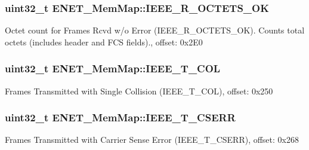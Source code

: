 \subsubsection[{I\+E\+E\+E\+\_\+\+R\+\_\+\+O\+C\+T\+E\+T\+S\+\_\+\+O\+K}]{\setlength{\rightskip}{0pt plus 5cm}uint32\+\_\+t E\+N\+E\+T\+\_\+\+Mem\+Map\+::\+I\+E\+E\+E\+\_\+\+R\+\_\+\+O\+C\+T\+E\+T\+S\+\_\+\+O\+K}\label{struct_e_n_e_t___mem_map_ad80de3963e00bd1d815615de321b1ee4}
Octet count for Frames Rcvd w/o Error (I\+E\+E\+E\+\_\+\+R\+\_\+\+O\+C\+T\+E\+T\+S\+\_\+\+O\+K). Counts total octets (includes header and F\+C\+S fields)., offset\+: 0x2\+E0 \hypertarget{struct_e_n_e_t___mem_map_a03ac6e803f105df7d966e0e147715072}{}
\subsubsection[{I\+E\+E\+E\+\_\+\+T\+\_\+1\+C\+O\+L}]{\setlength{\rightskip}{0pt plus 5cm}uint32\+\_\+t E\+N\+E\+T\+\_\+\+Mem\+Map\+::\+I\+E\+E\+E\+\_\+\+T\+\_\+C\+O\+L}\label{struct_e_n_e_t___mem_map_a03ac6e803f105df7d966e0e147715072}
Frames Transmitted with Single Collision (I\+E\+E\+E\+\_\+\+T\+\_\+C\+O\+L), offset\+: 0x250 \hypertarget{struct_e_n_e_t___mem_map_ab48cdc7505cabb90165d8e20ff2643e2}{}
\subsubsection[{I\+E\+E\+E\+\_\+\+T\+\_\+\+C\+S\+E\+R\+R}]{\setlength{\rightskip}{0pt plus 5cm}uint32\+\_\+t E\+N\+E\+T\+\_\+\+Mem\+Map\+::\+I\+E\+E\+E\+\_\+\+T\+\_\+\+C\+S\+E\+R\+R}\label{struct_e_n_e_t___mem_map_ab48cdc7505cabb90165d8e20ff2643e2}
Frames Transmitted with Carrier Sense Error (I\+E\+E\+E\+\_\+\+T\+\_\+\+C\+S\+E\+R\+R), offset\+: 0x268 \hypertarget{struct_e_n_e_t___mem_map_aafb1b9be07fdb0ed86bec13c6d12079d}{}
